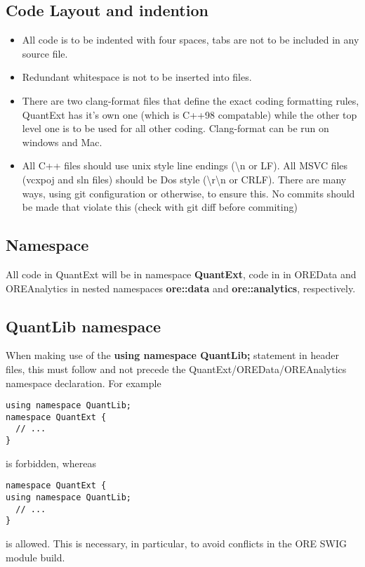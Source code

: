 \documentclass[12pt, a4paper]{article}
\begin{document}
\subsection*{Code Layout and indention}
\begin{itemize}
\item All code is to be indented with four spaces, tabs are not to be included in any source file.
\item Redundant whitespace is not to be inserted into files. 
\item There are two clang-format files that define the exact coding formatting rules, QuantExt has it's own one (which is C++98 compatable) while the other top level one is to be used for all other coding. Clang-format can be run on windows and Mac.
\item All C++ files should use unix style line endings (\textbackslash n or LF). All MSVC files (vcxpoj and sln files) should be Dos style (\textbackslash r\textbackslash n or CRLF). There are many ways, using git configuration or otherwise, to ensure this. No commits should be made that violate this (check with git diff before commiting)
\end{itemize}

\subsection*{Namespace}
All code in QuantExt will be in namespace \textbf{QuantExt}, code in in OREData and OREAnalytics in nested namespaces \textbf{ore::data} and \textbf{ore::analytics}, respectively. 

\subsection*{QuantLib namespace}
When making use of the \textbf{using namespace QuantLib;} statement in header files, this must follow and not precede the QuantExt/OREData/OREAnalytics namespace declaration. For example

\begin{verbatim} 
using namespace QuantLib;
namespace QuantExt {
  // ...
}
\end{verbatim}

\noindent
is forbidden, whereas

\begin{verbatim} 
namespace QuantExt {
using namespace QuantLib;
  // ...
}
\end{verbatim}

\noindent
is allowed. This is necessary, in particular, to avoid conflicts in the ORE SWIG module build.
\end{document}
